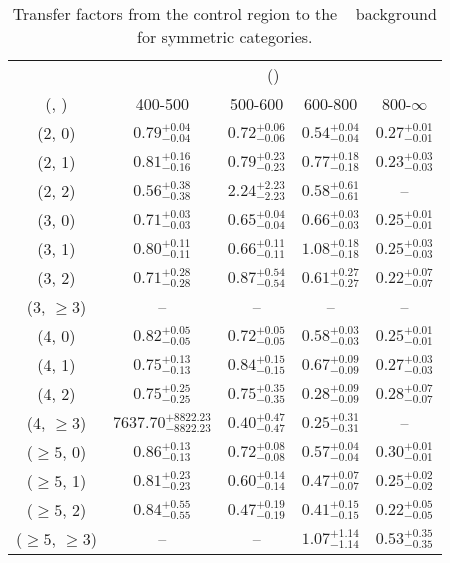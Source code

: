 \begin{table}[h!]
\tiny
\centering
\caption{Transfer factors from the \gj control region to the \zInv~ background for symmetric categories.\label{tab:tf_gj_zinv_sym}}
\begin{tabular}
{ccccc}
	\hline\hline
	& \multicolumn{4}{c}{\scalht (\gev)} \\ 
	 (\njet,  \nb) & 400-500 & 500-600 & 600-800 & 800-$\infty$ \\ [0.8ex] 
\hline
	(2, 0) & $0.79^{+ 0.04 }_{- 0.04 }$ & $0.72^{+ 0.06 }_{- 0.06 }$ & $0.54^{+ 0.04 }_{- 0.04 }$ & $0.27^{+ 0.01 }_{- 0.01 }$ \\[0.5ex] 
	(2, 1) & $0.81^{+ 0.16 }_{- 0.16 }$ & $0.79^{+ 0.23 }_{- 0.23 }$ & $0.77^{+ 0.18 }_{- 0.18 }$ & $0.23^{+ 0.03 }_{- 0.03 }$ \\[0.5ex] 
	(2, 2) & $0.56^{+ 0.38 }_{- 0.38 }$ & $2.24^{+ 2.23 }_{- 2.23 }$ & $0.58^{+ 0.61 }_{- 0.61 }$ & -- \\[0.5ex] 
	(3, 0) & $0.71^{+ 0.03 }_{- 0.03 }$ & $0.65^{+ 0.04 }_{- 0.04 }$ & $0.66^{+ 0.03 }_{- 0.03 }$ & $0.25^{+ 0.01 }_{- 0.01 }$ \\[0.5ex] 
	(3, 1) & $0.80^{+ 0.11 }_{- 0.11 }$ & $0.66^{+ 0.11 }_{- 0.11 }$ & $1.08^{+ 0.18 }_{- 0.18 }$ & $0.25^{+ 0.03 }_{- 0.03 }$ \\[0.5ex] 
	(3, 2) & $0.71^{+ 0.28 }_{- 0.28 }$ & $0.87^{+ 0.54 }_{- 0.54 }$ & $0.61^{+ 0.27 }_{- 0.27 }$ & $0.22^{+ 0.07 }_{- 0.07 }$ \\[0.5ex] 
	(3, $\ge3$) & -- & -- & -- & -- \\[0.5ex] 
	(4, 0) & $0.82^{+ 0.05 }_{- 0.05 }$ & $0.72^{+ 0.05 }_{- 0.05 }$ & $0.58^{+ 0.03 }_{- 0.03 }$ & $0.25^{+ 0.01 }_{- 0.01 }$ \\[0.5ex] 
	(4, 1) & $0.75^{+ 0.13 }_{- 0.13 }$ & $0.84^{+ 0.15 }_{- 0.15 }$ & $0.67^{+ 0.09 }_{- 0.09 }$ & $0.27^{+ 0.03 }_{- 0.03 }$ \\[0.5ex] 
	(4, 2) & $0.75^{+ 0.25 }_{- 0.25 }$ & $0.75^{+ 0.35 }_{- 0.35 }$ & $0.28^{+ 0.09 }_{- 0.09 }$ & $0.28^{+ 0.07 }_{- 0.07 }$ \\[0.5ex] 
	(4, $\ge3$) & $7637.70^{+ 8822.23 }_{- 8822.23 }$ & $0.40^{+ 0.47 }_{- 0.47 }$ & $0.25^{+ 0.31 }_{- 0.31 }$ & -- \\[0.5ex] 
	($\ge5$, 0) & $0.86^{+ 0.13 }_{- 0.13 }$ & $0.72^{+ 0.08 }_{- 0.08 }$ & $0.57^{+ 0.04 }_{- 0.04 }$ & $0.30^{+ 0.01 }_{- 0.01 }$ \\[0.5ex] 
	($\ge5$, 1) & $0.81^{+ 0.23 }_{- 0.23 }$ & $0.60^{+ 0.14 }_{- 0.14 }$ & $0.47^{+ 0.07 }_{- 0.07 }$ & $0.25^{+ 0.02 }_{- 0.02 }$ \\[0.5ex] 
	($\ge5$, 2) & $0.84^{+ 0.55 }_{- 0.55 }$ & $0.47^{+ 0.19 }_{- 0.19 }$ & $0.41^{+ 0.15 }_{- 0.15 }$ & $0.22^{+ 0.05 }_{- 0.05 }$ \\[0.5ex] 
	($\ge5$, $\ge3$) & -- & -- & $1.07^{+ 1.14 }_{- 1.14 }$ & $0.53^{+ 0.35 }_{- 0.35 }$ \\[0.5ex] 
	\hline
	\hline
\end{tabular}
\end{table}
